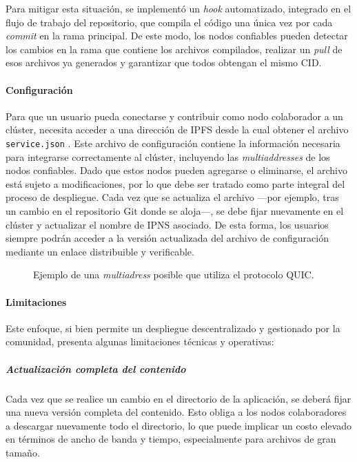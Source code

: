 Para mitigar esta situación, se implementó un \textit{hook} automatizado, integrado en el flujo de trabajo del repositorio, que compila el código una única vez por cada \textit{commit} en la rama principal. De este modo, los nodos confiables pueden detectar los cambios en la rama que contiene los archivos compilados, realizar un \textit{pull} de esos archivos ya generados y garantizar que todos obtengan el mismo CID.

\paragraph{Configuración} Para que un usuario pueda conectarse y contribuir como nodo colaborador a un clúster, necesita acceder a una dirección de IPFS desde la cual obtener el archivo \texttt{service.json} \cite{service-json}. Este archivo de configuración contiene la información necesaria para integrarse correctamente al clúster, incluyendo las \textit{multiaddresses} \cite{multiaddr} de los nodos confiables.
Dado que estos nodos pueden agregarse o eliminarse, el archivo está sujeto a modificaciones, por lo que debe ser tratado como parte integral del proceso de despliegue. Cada vez que se actualiza el archivo —por ejemplo, tras un cambio en el repositorio Git donde se aloja—, se debe fijar nuevamente en el clúster y actualizar el nombre de IPNS asociado. De esta forma, los usuarios siempre podrán acceder a la versión actualizada del archivo de configuración mediante un enlace distribuible y verificable.

\begin{figure}[H]
\centering
{}
\caption{Ejemplo de una \textit{multiadress} posible que utiliza el protocolo QUIC.}
\end{figure}

\paragraph{Limitaciones}

Este enfoque, si bien permite un despliegue descentralizado y gestionado por la comunidad, presenta algunas limitaciones técnicas y operativas:

\subparagraph{Actualización completa del contenido} Cada vez que se realice un cambio en el directorio de la aplicación, se deberá fijar una nueva versión completa del contenido. Esto obliga a los nodos colaboradores a descargar nuevamente todo el directorio, lo que puede implicar un costo elevado en términos de ancho de banda y tiempo, especialmente para archivos de gran tamaño.

